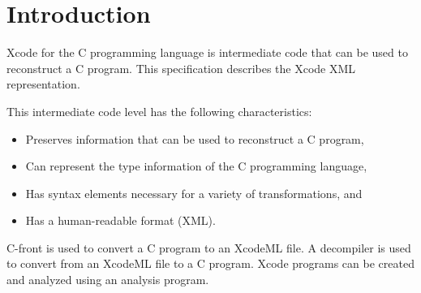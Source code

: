 \section{Introduction}


Xcode for the C programming language is intermediate code that can be used to reconstruct a C program. This specification describes the Xcode XML representation.

This intermediate code level has the following characteristics:

\begin{itemize}
\item Preserves information that can be used to reconstruct a C program,
\item Can represent the type information of the C programming language, 
\item Has syntax elements necessary for a variety of transformations, and
\item Has a human-readable format (XML).
\end{itemize}

C-front is used to convert a C program to an XcodeML file. A decompiler is used to convert from an XcodeML file to a C program. Xcode programs can be created and analyzed using an analysis program.

